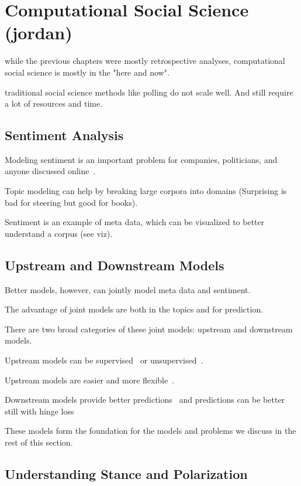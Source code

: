 
\chapter{Computational Social Science (jordan)}
\label{ch:css}

 while the previous chapters were mostly retrospective analyses, computational social science is mostly in the "here and now".

 traditional social science methods like polling do not scale well. And still require a lot of resources and time.

\section{Sentiment Analysis}

Modeling sentiment is an important problem for companies, politicians,
and anyone discussed online~\citep{pang-08}. 

Topic modeling can help by breaking large corpora into domains
(Surprising is bad for steering but good for books).

Sentiment is an example of meta data, which can be visualized to
better understand a corpus (see viz).

\section{Upstream and Downstream Models}

Better models, however, can jointly model meta data and sentiment.  

The advantage of joint models are both in the topics and for
prediction.

There are two broad categories of these joint models: upstream and
downstream models.

Upstream models can be supervised~\citep{mimno-08} or
unsupervised~\citep{lin-09}.

Upstream models are easier and more flexible~\citep{stewart-14}.

Downstream models provide better predictions~\citep{blei-07b} and
predictions can be better still with hinge loss~\citep{zhu-09}

These models form the foundation for the models and problems we
discuss in the rest of this section. 

\section{Understanding Stance and Polarization}


